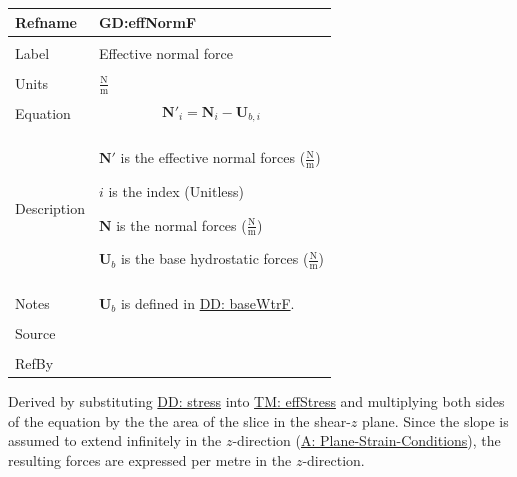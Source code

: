 \documentclass[12pt]{article}
\begin{document}
\noindent \begin{minipage}{\textwidth}
\begin{tabular}{p{} p{}}
\toprule \textbf{Refname} & \textbf{GD:effNormF}
\label{GD:effNormF}
\\ \midrule \\
Label & Effective normal force
\\ \midrule \\
Units & $\frac{\text{N}}{\text{m}}$
\\ \midrule \\
Equation & \begin{displaymath}
           {\mathbf{N'}}_{i}={\mathbf{N}}_{i}-{\mathbf{U}_{b,i}}
           \end{displaymath}
\\ \midrule \\
Description & \begin{symbDescription}
              \item{$\mathbf{N'}$ is the effective normal forces ($\frac{\text{N}}{\text{m}}$)}
              \item{$i$ is the index (Unitless)}
              \item{$\mathbf{N}$ is the normal forces ($\frac{\text{N}}{\text{m}}$)}
              \item{${\mathbf{U}_{b}}$ is the base hydrostatic forces ($\frac{\text{N}}{\text{m}}$)}
              \end{symbDescription}
\\ \midrule \\
Notes & ${\mathbf{U}_{b}}$ is defined in \hyperref[DD:baseWtrF]{DD: baseWtrF}.
\\ \midrule \\
Source & \cite{chen2005}
\\ \midrule \\
RefBy & 
\\ \bottomrule \end{tabular}
\end{minipage}
Derived by substituting \hyperref[DD:stress]{DD: stress} into \hyperref[TM:effStress]{TM: effStress} and multiplying both sides of the equation by the the area of the slice in the shear-$z$ plane. Since the slope is assumed to extend infinitely in the $z$-direction (\hyperref[assumpPSC]{A: Plane-Strain-Conditions}), the resulting forces are expressed per metre in the $z$-direction.
\par~
\end{document}
